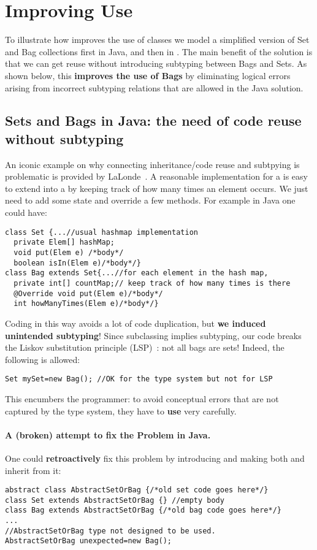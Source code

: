 \section{Improving Use}

To illustrate how 
\name improves the use of classes we model a simplified version of
Set and Bag collections first in Java, and then in \name.
The main benefit of the \name solution is that we can get reuse 
without introducing subtyping between Bags and Sets.
As shown below, this \textbf{improves the 
use of Bags} by eliminating logical errors arising from incorrect
subtyping relations that are allowed in the Java solution. 

\subsection{Sets and Bags in Java: the need of code reuse without subtyping}
An iconic example on why connecting inheritance/code reuse and
subtpying is problematic is provided by
LaLonde~\cite{LaLonde:1991:SSS:110673.110679}.  A reasonable
implementation for a \Q@Set@ is easy to extend into a \Q@Bag@ by
keeping track of how many times an element occurs.  We just need to
add some state and override a few methods.
For example in Java one could have:

\begin{lstlisting}
class Set {...//usual hashmap implementation
  private Elem[] hashMap;
  void put(Elem e) /*body*/
  boolean isIn(Elem e)/*body*/}
class Bag extends Set{...//for each element in the hash map,
  private int[] countMap;// keep track of how many times is there
  @Override void put(Elem e)/*body*/
  int howManyTimes(Elem e)/*body*/}
\end{lstlisting}

\noindent Coding \Q@Bag@ in this way avoids a lot of code
duplication, but \textbf{we induced unintended subtyping}! 
Since subclassing implies subtyping, our code breaks the Liskov substitution principle (LSP)~\cite{martin2000design}: not all bags are sets!
Indeed, the following is allowed:

\begin{lstlisting}
Set mySet=new Bag(); //OK for the type system but not for LSP
\end{lstlisting}
This encumbers the programmer:
to avoid conceptual errors that are not captured by the type system, 
they have to \textbf{use} \Q@Bag@ very carefully.


\paragraph{A (broken) attempt to fix the Problem in Java.}
One could \textbf{retroactively} fix this problem by introducing \Q@AbstractSetOrBag@
and making both \Q@Bag@ and \Q@Set@ inherit from it:
\begin{lstlisting}
abstract class AbstractSetOrBag {/*old set code goes here*/}
class Set extends AbstractSetOrBag {} //empty body
class Bag extends AbstractSetOrBag {/*old bag code goes here*/}
...
//AbstractSetOrBag type not designed to be used.
AbstractSetOrBag unexpected=new Bag(); 
\end{lstlisting}

